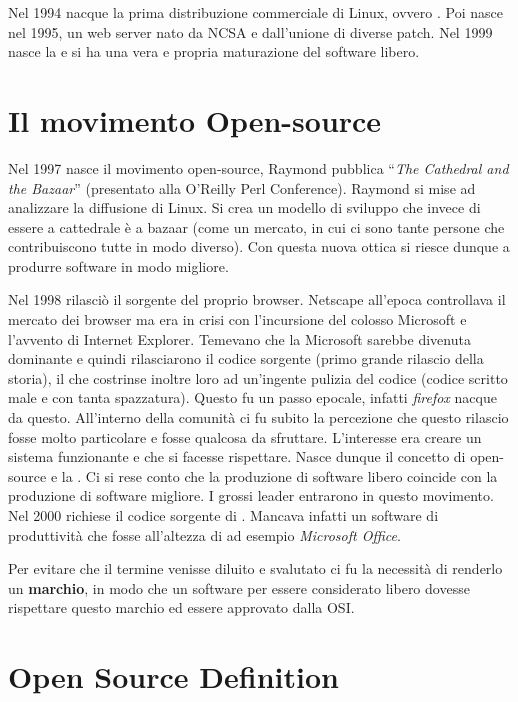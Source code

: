 Nel 1994 nacque la prima distribuzione commerciale di Linux, ovvero . Poi nasce  nel 1995, un web server nato da NCSA e dall'unione di diverse patch. Nel 1999 nasce la  e si ha una vera e propria maturazione del software libero.

\section{Il movimento Open-source}

Nel 1997 nasce il movimento open-source, Raymond pubblica ``\textit{The Cathedral and the Bazaar}'' (presentato alla O'Reilly Perl Conference). Raymond si mise ad analizzare la diffusione di Linux. Si crea un modello di sviluppo che invece di essere a cattedrale è a bazaar (come un mercato, in cui ci sono tante persone che contribuiscono tutte in modo diverso). Con questa nuova ottica si riesce dunque a produrre software in modo migliore.

Nel 1998  rilasciò il sorgente del proprio browser. Netscape all'epoca controllava il mercato dei browser ma era in crisi con l'incursione del colosso Microsoft e l'avvento di Internet Explorer. Temevano che la Microsoft sarebbe divenuta dominante e quindi rilasciarono il codice sorgente (primo grande rilascio della storia), il che costrinse inoltre loro ad un'ingente pulizia del codice (codice scritto male e con tanta spazzatura). Questo fu un passo epocale, infatti \textit{firefox} nacque da questo. All'interno della comunità ci fu subito la percezione che questo rilascio fosse molto particolare e fosse qualcosa da sfruttare. L'interesse era creare un sistema funzionante e che si facesse rispettare. Nasce dunque il concetto di open-source e la . Ci si rese conto che la produzione di software libero coincide con la produzione di software migliore. I grossi leader entrarono in questo movimento. Nel 2000  richiese il codice sorgente di . Mancava infatti un software di produttività che fosse all'altezza di ad esempio \textit{Microsoft Office}.

Per evitare che il termine venisse diluito e svalutato ci fu la necessità di renderlo un \textbf{marchio}, in modo che un software per essere considerato libero dovesse rispettare questo marchio ed essere approvato dalla OSI. 

\section{Open Source Definition}

